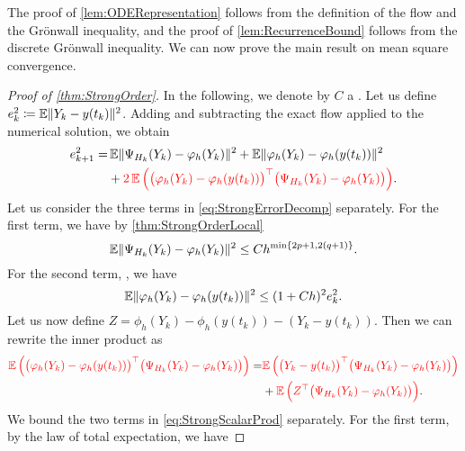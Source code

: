 \documentclass[10pt]{article}
\begin{document}
The proof of \cref{lem:ODERepresentation} follows from the definition of the flow and the Grönwall inequality, and the proof of \cref{lem:RecurrenceBound} follows from the discrete Grönwall inequality. We can now prove the main result on mean square convergence.
\begin{proof}[Proof of \cref{thm:StrongOrder}] In the following, we denote by $C$ a . Let us define $e_k^2 \coloneqq \operatorname{\mathbb{E}}\lVert Y_k - y(t_k)\rVert^2$. Adding and subtracting the exact flow applied to the numerical solution, we obtain
	\begin{equation}\label{eq:StrongErrorDecomp}
		\begin{aligned}
			e_{k+1}^2 = &\operatorname{\mathbb{E}}\lVert\Psi_{H_k}(Y_k) - \varphi_{h}(Y_k)\rVert^2 + \operatorname{\mathbb{E}}\lVert\varphi_{h}(Y_k) - \varphi_{h}(y(t_k))\rVert^2 \\
					  &+ {\color{red}2\operatorname{\mathbb{E}}\Big(\big(\varphi_{h}(Y_k) - \varphi_{h}(y(t_k))\big)^\top \big(\Psi_{H_k}(Y_k) - \varphi_{h}(Y_k)\big)\Big)}.
		\end{aligned}
	\end{equation}
	Let us consider the three terms in \eqref{eq:StrongErrorDecomp} separately. For the first term, we have by \cref{thm:StrongOrderLocal}
	\begin{equation}\label{eq:StrongFirstTerm}
		\operatorname{\mathbb{E}}\lVert\Psi_{H_k}(Y_k) - \varphi_{h}(Y_k)\rVert^2 \leq Ch^{\min\{2p+1, 2(q+1)\}}.
	\end{equation}
    For the second term, , we have
	\begin{equation}\label{eq:StrongSecondTerm}
		\operatorname{\mathbb{E}}\lVert\varphi_{h}(Y_k) - \varphi_{h}(y(t_k))\rVert^2 \leq (1 + Ch)^2 e_k^2.
	\end{equation}
	Let us now define $Z = \phi_{h}(Y_k) - \phi_{h}(y(t_k)) - (Y_k - y(t_k))$. Then we can rewrite the inner product as
	\begin{equation}\label{eq:StrongScalarProd}
	\begin{aligned}
		{\color{red}\operatorname{\mathbb{E}}\Big(\big(\varphi_{h}(Y_k) - \varphi_{h}(y(t_k))\big)^\top \big(\Psi_{H_k}(Y_k) - \varphi_{h}(Y_k)\big)\Big)} = &{\color{red}\operatorname{\mathbb{E}}\Big(\big(Y_k - y(t_k)\big)^\top \big(\Psi_{H_k}(Y_k) - \varphi_{h}(Y_k)\big)\Big)} \\
		&+ {\color{red}\operatorname{\mathbb{E}}\Big(Z^\top \big(\Psi_{H_k}(Y_k) - \varphi_{h}(Y_k)\big)\Big)}.
	\end{aligned}
	\end{equation}
	We bound the two terms in \eqref{eq:StrongScalarProd} separately. For the first term, by the law of total expectation, we have

\end{proof}
\end{document}
